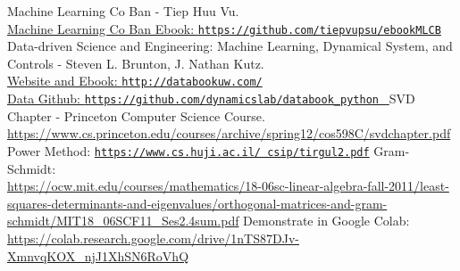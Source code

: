 \documentclass[a4paper, 12pt]{report}
\begin{document}
\begin{thebibliography}{9}
Machine Learning Co Ban - Tiep Huu Vu.
\\ \href{https://github.com/tiepvupsu/ebookMLCB}{Machine Learning Co Ban Ebook: \texttt{https://github.com/tiepvupsu/ebookMLCB}}
Data-driven Science and Engineering: Machine Learning, Dynamical System, and Controls - Steven L. Brunton, J. Nathan Kutz.
\\
\href{http://databookuw.com/}{Website and Ebook: \texttt{http://databookuw.com/}} \\
\href{https://github.com/dynamicslab/databook_python}{Data Github:    \texttt{https://github.com/dynamicslab/databook\_python } }
SVD Chapter - Princeton Computer Science Course.
\href{https://www.cs.princeton.edu/courses/archive/spring12/cos598C/svdchapter.pdf}{\\https://www.cs.princeton.edu/courses/archive/spring12/cos598C/svdchapter.pdf}
Power Method: \href{https://www.cs.huji.ac.il/~csip/tirgul2.pdf}{ \texttt{https://www.cs.huji.ac.il/~csip/tirgul2.pdf}}
Gram-Schmidt:
\href{https://ocw.mit.edu/courses/mathematics/18-06sc-linear-algebra-fall-2011/least-squares-determinants-and-eigenvalues/orthogonal-matrices-and-gram-schmidt/MIT18_06SCF11_Ses2.4sum.pdf}{\\https://ocw.mit.edu/courses/mathematics/18-06sc-linear-algebra-fall-2011/least-squares-determinants-and-eigenvalues/orthogonal-matrices-and-gram-schmidt/MIT18\_06SCF11\_Ses2.4sum.pdf}
Demonstrate in Google Colab:\\ \href{https://colab.research.google.com/drive/1nTS87DJv-XmnvqKOX_njJ1XhSN6RoVhQ}{https://colab.research.google.com/drive/1nTS87DJv-XmnvqKOX_njJ1XhSN6RoVhQ}
\end{thebibliography}
\end{document}
